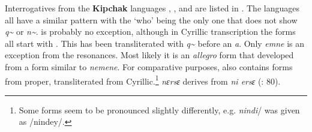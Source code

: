 Interrogatives from the \textbf{Kipchak} languages , , and  are listed in . The languages all have a similar  pattern with the  ‘who’ being the only one that does not show \textit{q{\textasciitilde}} or \textit{n{\textasciitilde}}.  is probably no exception, although in Cyrillic transcription the forms all start with . This has been transliterated with \textit{q{\textasciitilde}} before an \textit{a}. Only  \textit{emne} is an exception from the resonances. Most likely it is an \textit{allegro} form that developed from a form similar to  \textit{nemene}. For comparative purposes,  also contains forms from  proper, transliterated from Cyrillic.\footnote{Some forms seem to be pronounced slightly differently, e.g. \textit{nindi}/ was given as /nindey/.}  \textit{nɛrsɛ} derives from \textit{ni ersɛ} (\citealt{ChenZongzhenYiLiqian1986}: 80).

\begin{table}[p]
\caption{Interrogatives from Chinese Tatar (\citealt{ChenZongzhenYiLiqian1986}: 34, 79f., 185), Tatar (\citealt{Poppe1963}: 81f., 219, 234f. passim), Kazakh (\citealt{GengShiminLiZengxiang1985}: 53, 103, 172, 238), and Kyrgyz  as spoken in China (\citealt{HuZhenhua1986}: 58, 251)}
\label{tab:turk:11}

\end{table}

